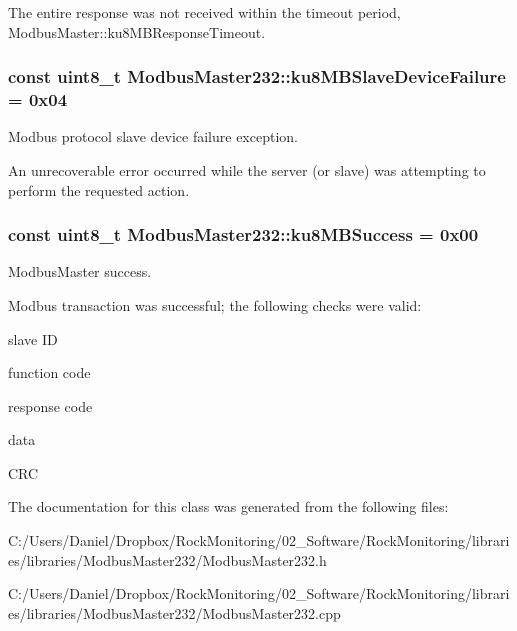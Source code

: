 The entire response was not received within the timeout period, Modbus\+Master\+::ku8\+M\+B\+Response\+Timeout. 
\subsubsection[{\texorpdfstring{ku8\+M\+B\+Slave\+Device\+Failure}{ku8MBSlaveDeviceFailure}}]{\setlength{\rightskip}{0pt plus 5cm}const uint8\+\_\+t Modbus\+Master232\+::ku8\+M\+B\+Slave\+Device\+Failure = 0x04\hspace{0.3cm}{\ttfamily [static]}}\hypertarget{class_modbus_master232_af9baebfe630c87f0d678110d38999cf2}{}\label{class_modbus_master232_af9baebfe630c87f0d678110d38999cf2}
Modbus protocol slave device failure exception.

An unrecoverable error occurred while the server (or slave) was attempting to perform the requested action. 
\subsubsection[{\texorpdfstring{ku8\+M\+B\+Success}{ku8MBSuccess}}]{\setlength{\rightskip}{0pt plus 5cm}const uint8\+\_\+t Modbus\+Master232\+::ku8\+M\+B\+Success = 0x00\hspace{0.3cm}{\ttfamily [static]}}\hypertarget{class_modbus_master232_a6b6f40ff2ea76159dd2073a704588363}{}\label{class_modbus_master232_a6b6f40ff2ea76159dd2073a704588363}
Modbus\+Master success.

Modbus transaction was successful; the following checks were valid\+:
\begin{DoxyItemize}
\item slave ID
\item function code
\item response code
\item data
\item C\+RC 
\end{DoxyItemize}

The documentation for this class was generated from the following files\+:\begin{DoxyCompactItemize}
\item 
C\+:/\+Users/\+Daniel/\+Dropbox/\+Rock\+Monitoring/02\+\_\+\+Software/\+Rock\+Monitoring/libraries/libraries/\+Modbus\+Master232/Modbus\+Master232.\+h\item 
C\+:/\+Users/\+Daniel/\+Dropbox/\+Rock\+Monitoring/02\+\_\+\+Software/\+Rock\+Monitoring/libraries/libraries/\+Modbus\+Master232/Modbus\+Master232.\+cpp\end{DoxyCompactItemize}
